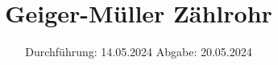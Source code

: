 

\subject{V703}
\title{Geiger-Müller Zählrohr}
\date{%
  Durchführung: 14.05.2024
  \hspace{3em}
  Abgabe: 20.05.2024
}



\maketitle
\thispagestyle{empty}
\tableofcontents
\newpage






\printbibliography{}


